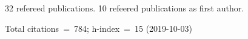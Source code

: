 32 refereed publications. 10 refeered publications as first author.

Total citations~=~784; h-index~=~15 (2019-10-03)